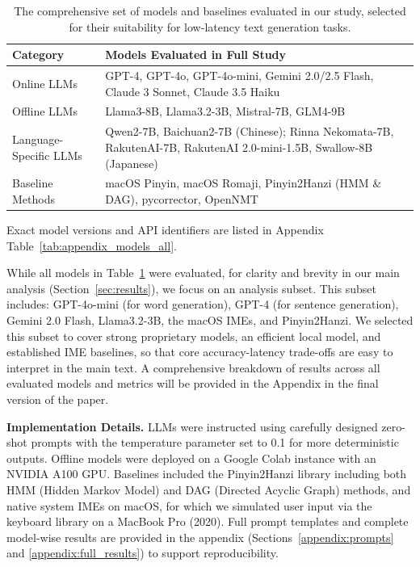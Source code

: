 \documentclass[10pt, a4paper]{article}
\begin{document}
\begin{table}[h!]
\centering
\small
\begin{tabular}{p{1.5cm} p{5.3cm}}
\hline
\textbf{Category} & \textbf{Models Evaluated in Full Study} \\
\hline
Online LLMs & GPT-4, GPT-4o, GPT-4o-mini, Gemini 2.0/2.5 Flash, Claude 3 Sonnet, Claude 3.5 Haiku \\
\hline
Offline LLMs & Llama3-8B, Llama3.2-3B, Mistral-7B, GLM4-9B \\
\hline
Language-Specific LLMs & Qwen2-7B, Baichuan2-7B (Chinese); Rinna Nekomata-7B, RakutenAI-7B, RakutenAI 2.0-mini-1.5B, Swallow-8B (Japanese) \\
\hline
Baseline Methods & macOS Pinyin, macOS Romaji, {Pinyin2Hanzi} (HMM \& DAG), {pycorrector}, {OpenNMT} \\
\hline
\end{tabular}
\caption{The comprehensive set of models and baselines evaluated in our study, selected for their suitability for low-latency text generation tasks.}
\label{tab:models_all_scope}
\end{table}

Exact model versions and API identifiers are listed in Appendix Table~\ref{tab:appendix_models_all}.

While all models in Table~\ref{tab:models_all_scope} were evaluated, for clarity and brevity in our main analysis (Section~\ref{sec:results}), we focus on an analysis subset. This subset includes: GPT-4o-mini (for word generation), GPT-4 (for sentence generation), Gemini 2.0 Flash, Llama3.2-3B, the macOS IMEs, and Pinyin2Hanzi. We selected this subset to cover strong proprietary models, an efficient local model, and established IME baselines, so that core accuracy-latency trade-offs are easy to interpret in the main text.
A comprehensive breakdown of results across all evaluated models and metrics will be provided in the Appendix in the final version of the paper.

\textbf{Implementation Details.}
LLMs were instructed using carefully designed zero-shot prompts with the {temperature} parameter set to 0.1 for more deterministic outputs. Offline models were deployed on a Google Colab instance with an NVIDIA A100 GPU. Baselines included the {Pinyin2Hanzi} library \citep{pinyin2hanzi} including both {HMM} (Hidden Markov Model) and {DAG} (Directed Acyclic Graph) methods, and native system IMEs on macOS, for which we simulated user input via the {keyboard} library \citep{keyboard} on a MacBook Pro (2020). Full prompt templates and complete model-wise results are provided in the appendix (Sections~\ref{appendix:prompts} and \ref{appendix:full_results}) to support reproducibility.
\end{document}
